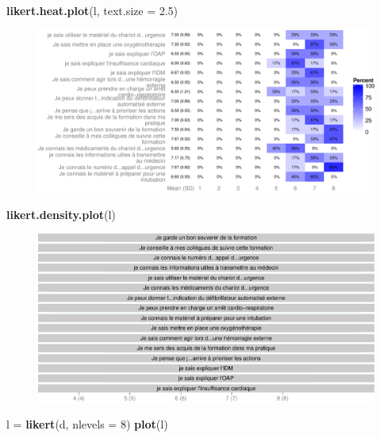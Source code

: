 \documentclass[]{article}
\newenvironment{Shaded}{\begin{snugshade}}{\end{snugshade}}
\newcommand{\KeywordTok}[1]{\textcolor[rgb]{0.13,0.29,0.53}{\textbf{{#1}}}}
\newcommand{\DataTypeTok}[1]{\textcolor[rgb]{0.13,0.29,0.53}{{#1}}}
\newcommand{\DecValTok}[1]{\textcolor[rgb]{0.00,0.00,0.81}{{#1}}}
\newcommand{\FloatTok}[1]{\textcolor[rgb]{0.00,0.00,0.81}{{#1}}}
\newcommand{\StringTok}[1]{\textcolor[rgb]{0.31,0.60,0.02}{{#1}}}
\newcommand{\NormalTok}[1]{{#1}}
\begin{document}
\begin{Shaded}
\begin{Highlighting}[]
\KeywordTok{likert.heat.plot}\NormalTok{(l, }\DataTypeTok{text.size =} \FloatTok{2.5}\NormalTok{)}
\end{Highlighting}
\end{Shaded}

\begin{figure}[htbp]
\centering
\includegraphics{./questionaire_distance_files/figure-latex/test-2.pdf}
\end{figure}

\begin{Shaded}
\begin{Highlighting}[]
\KeywordTok{likert.density.plot}\NormalTok{(l)}
\end{Highlighting}
\end{Shaded}

\begin{figure}[htbp]
\centering
\includegraphics{./questionaire_distance_files/figure-latex/test-3.pdf}
\end{figure}

\begin{Shaded}
\begin{Highlighting}[]
\NormalTok{l =}\StringTok{ }\KeywordTok{likert}\NormalTok{(d, }\DataTypeTok{nlevels =} \DecValTok{8}\NormalTok{)}
\KeywordTok{plot}\NormalTok{(l)}
\end{Highlighting}
\end{Shaded}
\end{document}
